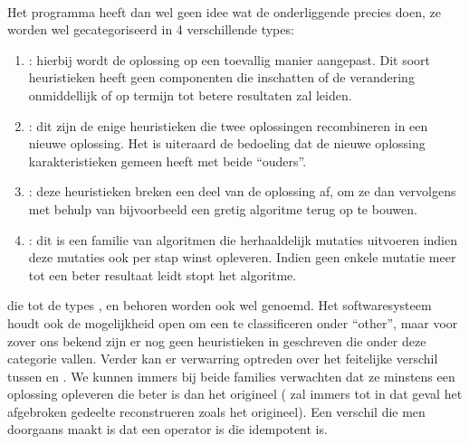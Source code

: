 \paragraph{}
Het programma heeft dan wel geen idee wat de onderliggende \abllhn{} precies doen, ze worden wel gecategoriseerd in 4 verschillende types:
\begin{enumerate}
 \item \emph{\abmt{}}: hierbij wordt de oplossing op een toevallig manier aangepast. Dit soort heuristieken heeft geen componenten die inschatten of de verandering onmiddellijk of op termijn tot betere resultaten zal leiden.
 \item \emph{\abco{}}: dit zijn de enige heuristieken die twee oplossingen recombineren in een nieuwe oplossing. Het is uiteraard de bedoeling dat de nieuwe oplossing karakteristieken gemeen heeft met beide ``ouders''.
 \item \emph{\abrr{}}: deze heuristieken breken een deel van de oplossing af, om ze dan vervolgens met behulp van bijvoorbeeld een gretig algoritme terug op te bouwen.
 \item \emph{\abls{}}: dit is een familie van algoritmen die herhaaldelijk mutaties uitvoeren indien deze mutaties ook per stap winst opleveren. Indien geen enkele mutatie meer tot een beter resultaat leidt stopt het algoritme.
\end{enumerate}
\abllhn[L]{} die tot de types \abmt{}, \abco{} en \abrr{} behoren worden ook wel \abpts{} genoemd. Het softwaresysteem houdt ook de mogelijkheid open om een \abllh{} te classificeren onder ``other'', maar voor zover ons bekend zijn er nog geen heuristieken in \abhf{} geschreven die onder deze categorie vallen. Verder kan er verwarring optreden over het feitelijke verschil tussen \abrr{} en \abls{}. We kunnen immers bij beide families verwachten dat ze minstens een oplossing opleveren die beter is dan het origineel (\abrr{} zal immers tot in dat geval het afgebroken gedeelte reconstrueren zoals het origineel). Een verschil die men doorgaans maakt is dat \abls{} een operator is die idempotent is.

\paragraph{}


\subsection{\abchescy{}}

